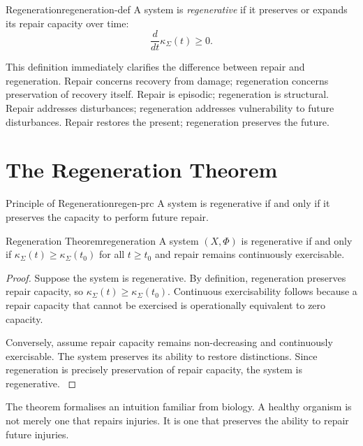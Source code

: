 \documentclass[12pt,twoside,openright]{book}
\newcounter{exercise}[chapter]
\begin{document}
\begin{definition}{Regeneration}{regeneration-def}
  A system is \emph{regenerative} if it preserves or
  expands its repair capacity over time:
  \[
    \frac{d}{dt}\kappa_\Sigma(t) \ge 0.
  \]
\end{definition}

This definition immediately clarifies the difference
between repair and regeneration. Repair concerns recovery
from damage; regeneration concerns preservation of recovery
itself. Repair is episodic; regeneration is structural.
Repair addresses disturbances; regeneration addresses
vulnerability to future disturbances. Repair restores the
present; regeneration preserves the future.

\section{The Regeneration Theorem}
\label{sec:ch11-theorem}

\begin{principle}{Principle of Regeneration}{regen-prc}
  A system is regenerative if and only if it preserves the
  capacity to perform future repair.
\end{principle}

\begin{theorem}{Regeneration Theorem}{regeneration}
  A system $(X,\Phi)$ is regenerative if and only if
  $\kappa_\Sigma(t)\ge\kappa_\Sigma(t_0)$ for all $t\ge t_0$
  and repair remains continuously exercisable.
\end{theorem}

\begin{proof}
  Suppose the system is regenerative. By definition,
  regeneration preserves repair capacity, so
  $\kappa_\Sigma(t)\ge\kappa_\Sigma(t_0)$. Continuous
  exercisability follows because a repair capacity that
  cannot be exercised is operationally equivalent to zero
  capacity.

  Conversely, assume repair capacity remains non-decreasing
  and continuously exercisable. The system preserves its
  ability to restore distinctions. Since regeneration is
  precisely preservation of repair capacity, the system is
  regenerative. \parencite{holling1973,gunderson2002}
\end{proof}

The theorem formalises an intuition familiar from biology.
A healthy organism is not merely one that repairs injuries.
It is one that preserves the ability to repair future
injuries.
\end{document}
